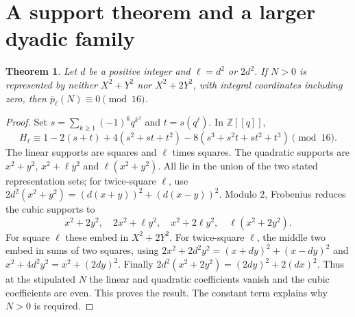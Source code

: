 \documentclass[11pt]{article}
\newtheorem{theorem}{Theorem}\newtheorem{lemma}[theorem]{Lemma}
\theoremstyle{remark}\newtheorem{remark}[theorem]{Remark}
\newcommand{\pb}{\overline{p}}
\begin{document}
\section{A support theorem and a larger dyadic family}
\begin{theorem}\label{thm:support}
Let $d$ be a positive integer and $\ell=d^2$ or $2d^2$. If $N>0$ is represented by neither $X^2+Y^2$ nor $X^2+2Y^2$, with integral coordinates including zero, then $\pb_\ell(N)\equiv0\pmod{16}$.
\end{theorem}
\begin{proof}
Set $s=\sum_{k\ge1}(-1)^kq^{k^2}$ and $t=s(q^\ell)$. In $\mathbb Z[[q]]$,
\[H_\ell\equiv1-2(s+t)+4(s^2+st+t^2)-8(s^3+s^2t+st^2+t^3)\pmod{16}.\]
The linear supports are squares and $\ell$ times squares. The quadratic supports are $x^2+y^2$, $x^2+\ell y^2$ and $\ell(x^2+y^2)$. All lie in the union of the two stated representation sets; for twice-square $\ell$, use $2d^2(x^2+y^2)=(d(x+y))^2+(d(x-y))^2$.
Modulo $2$, Frobenius reduces the cubic supports to
\[x^2+2y^2,\quad2x^2+\ell y^2,\quad x^2+2\ell y^2,\quad\ell(x^2+2y^2).\]
For square $\ell$ these embed in $X^2+2Y^2$. For twice-square $\ell$, the middle two embed in sums of two squares, using $2x^2+2d^2y^2=(x+dy)^2+(x-dy)^2$ and $x^2+4d^2y^2=x^2+(2dy)^2$. Finally $2d^2(x^2+2y^2)=(2dy)^2+2(dx)^2$. Thus at the stipulated $N$ the linear and quadratic coefficients vanish and the cubic coefficients are even. This proves the result. The constant term explains why $N>0$ is required.
\end{proof}
\end{document}

